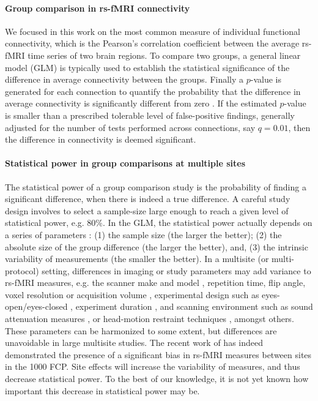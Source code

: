 \documentclass[authoryear]{elsarticle}
\begin{document}
\paragraph{Group comparison in rs-fMRI connectivity}
We focused in this work on the most common measure of individual functional connectivity, which is the Pearson's correlation coefficient between the average rs-fMRI time series of two brain regions. To compare two groups, a general linear model (GLM) is typically used to establish the statistical significance of the difference in average connectivity between the groups. Finally a $p$-value is generated for each connection to quantify the probability that the difference in average connectivity is significantly different from zero \citep{Worsley1995}. If the estimated $p$-value is smaller than a prescribed tolerable level of false-positive findings, generally adjusted for the number of tests performed across connections, say $q=0.01$, then the difference in connectivity is deemed significant. 

\paragraph{Statistical power in group comparisons at multiple sites}
The statistical power of a group comparison study is the probability of finding
a significant difference, when there is indeed a true difference. A careful
study design involves to select a sample-size large enough to reach a given
level of statistical power, e.g. $80\%$. In the GLM, the statistical power
actually depends on a series of parameters \citep{Desmond2002}: (1) the sample
size (the larger the better); (2) the absolute size of the group difference (the
larger the better), and, (3) the intrinsic variability of measurements (the
smaller the better).
In a multisite (or multi-protocol) setting, differences in imaging or study parameters may add variance to rs-fMRI measures, e.g. the scanner make and model \citep{Friedman2006}, repetition time, flip angle, voxel resolution or acquisition volume \citep{Friedman2006a}, experimental design such as eyes-open/eyes-closed \citep{Yan2009}, experiment duration \citep{VanDijk2010}, and scanning environment such as sound attenuation measures \citep{Elliott1999}, or head-motion restraint techniques \citep{Edward2000,VanDijk2012}, amongst others. These parameters can be harmonized to some extent, but differences are unavoidable in large multisite studies. The recent work of \cite{Yan2013h} has indeed demonstrated the presence of a significant bias in rs-fMRI measures between sites in the 1000 FCP. Site effects will increase the variability of measures, and thus decrease statistical power. To the best of our knowledge, it is not yet known how important this decrease in statistical power may be. 
\end{document}
